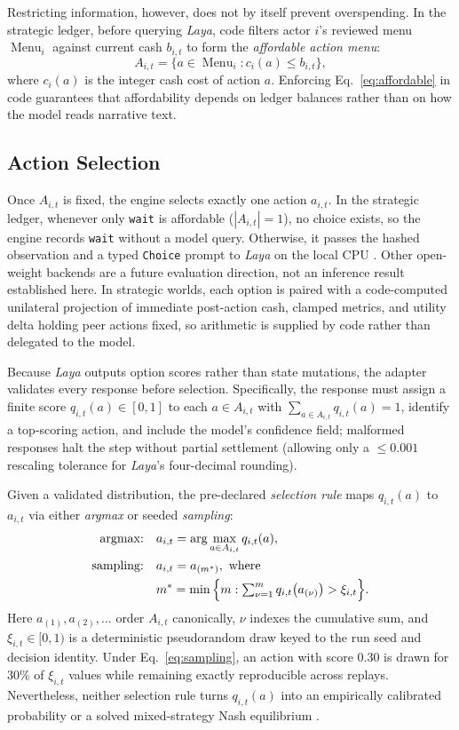 Restricting information, however, does not by itself prevent overspending.
In the strategic ledger, before querying \textit{Laya}, code filters actor $i$'s reviewed menu
$\operatorname{Menu}_i$ against current cash $b_{i,t}$ to form the
\textit{affordable action menu}:
\begin{equation}
A_{i,t}=\{a\in\operatorname{Menu}_i : c_i(a)\leq b_{i,t}\},
\label{eq:affordable}
\end{equation}
where $c_i(a)$ is the integer cash cost of action $a$. Enforcing
Eq.~\eqref{eq:affordable} in code guarantees that affordability depends on
ledger balances rather than on how the model reads narrative text.

\subsection{Action Selection}\label{sec:action-selection}
Once $A_{i,t}$ is fixed, the engine selects exactly one action $a_{i,t}$.
In the strategic ledger, whenever only \texttt{wait} is affordable ($|A_{i,t}|=1$), no choice exists, so
the engine records \texttt{wait} without a model query. Otherwise, it passes
the hashed observation and a typed \texttt{Choice} prompt to \textit{Laya} on
the local CPU \cite{layamodel}. Other open-weight backends are a future
evaluation direction, not an inference result established here. In strategic worlds, each option is paired
with a code-computed unilateral projection of immediate post-action cash,
clamped metrics, and utility delta holding peer actions fixed, so arithmetic is
supplied by code rather than delegated to the model.

Because \textit{Laya} outputs option scores rather than state mutations,
the adapter validates every response before selection. Specifically, the
response must assign a finite score $q_{i,t}(a)\in[0,1]$ to each $a\in A_{i,t}$
with $\sum_{a\in A_{i,t}} q_{i,t}(a)=1$, identify a top-scoring action, and
include the model's confidence field; malformed responses halt the step without
partial settlement (allowing only a $\le 0.001$ rescaling tolerance for
\textit{Laya}'s four-decimal rounding).

Given a validated distribution, the pre-declared \textit{selection rule}
maps $q_{i,t}(a)$ to $a_{i,t}$ via either \textit{argmax} or seeded
\textit{sampling}:
\begin{align}
\text{argmax:}\quad & a_{i,t}=\arg\max_{a\in A_{i,t}} q_{i,t}(a),\label{eq:selection}\\
\text{sampling:}\quad & a_{i,t}=a_{(m^\ast)},\ \text{where}\notag\\
& m^\ast=\min\Big\{m:\textstyle\sum_{\nu=1}^{m} q_{i,t}\big(a_{(\nu)}\big)>\xi_{i,t}\Big\}.\label{eq:sampling}
\end{align}
Here $a_{(1)},a_{(2)},\dots$ order $A_{i,t}$ canonically, $\nu$ indexes the
cumulative sum, and $\xi_{i,t}\in[0,1)$ is a deterministic pseudorandom draw
keyed to the run seed and decision identity. Under Eq.~\eqref{eq:sampling}, an
action with score $0.30$ is drawn for $30\%$ of $\xi_{i,t}$ values while
remaining exactly reproducible across replays. Nevertheless, neither
selection rule turns $q_{i,t}(a)$ into an empirically calibrated probability or
a solved mixed-strategy Nash equilibrium \cite{nash1950,polak15}.

